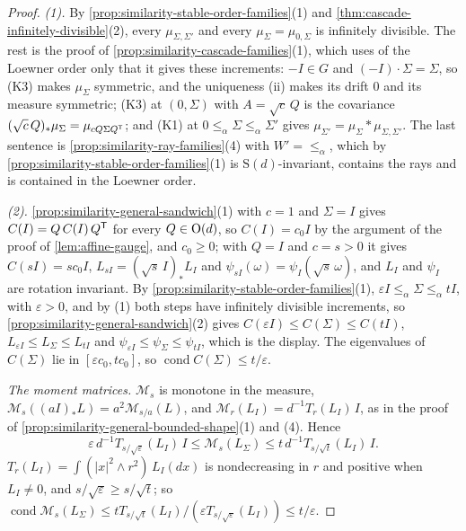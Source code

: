 \begin{proof}
\leanok
\emph{(1).} By \ref{prop:similarity-stable-order-families}(1) and \ref{thm:cascade-infinitely-divisible}(2), every $\mu_{\Sigma,\Sigma'}$ and every
$\mu_\Sigma = \mu_{0,\Sigma}$ is infinitely divisible. The rest is the proof of
\ref{prop:similarity-cascade-families}(1), which uses of the Loewner order only that it gives these
increments: $-I \in G$ and $(-I)\cdot\Sigma = \Sigma$, so (K3) makes $\mu_\Sigma$ symmetric, and the uniqueness
(ii) makes its drift $0$ and its \Levy{} measure symmetric; (K3) at $(0, \Sigma)$ with
$A = \sqrt c\,Q$ is the covariance $(\sqrt c\,Q)_*\mu_\Sigma = \mu_{cQ\Sigma Q^{\mathsf{T}}}$; and (K1) at
$0 \le_\alpha \Sigma \le_\alpha \Sigma'$ gives $\mu_{\Sigma'} = \mu_\Sigma * \mu_{\Sigma,\Sigma'}$. The last sentence
is \ref{prop:similarity-ray-families}(4) with $W' = \le_\alpha$, which by \ref{prop:similarity-stable-order-families}(1) is $\mathrm S(d)$-invariant,
contains the rays and is contained in the Loewner order.

\emph{(2).} \ref{prop:similarity-general-sandwich}(1) with $c = 1$ and $\Sigma = I$ gives $C(I) =
Q\,C(I)\,Q^{\mathsf{T}}$ for every $Q \in \mathrm{O}(d)$, so $C(I) = c_0I$ by the argument of the proof of
\ref{lem:affine-gauge}, and $c_0 \ge 0$; with $Q = I$ and $c = s > 0$ it gives $C(sI) = sc_0I$,
$L_{sI} = (\sqrt s\,I)_*L_I$ and $\psi_{sI}(\omega) = \psi_I(\sqrt s\,\omega)$, and $L_I$ and $\psi_I$ are
rotation invariant. By \ref{prop:similarity-stable-order-families}(1), $\varepsilon I \le_\alpha \Sigma \le_\alpha tI$, with $\varepsilon > 0$, and by (1) both steps have infinitely divisible increments, so \ref{prop:similarity-general-sandwich}(2) gives
$C(\varepsilon I) \le C(\Sigma) \le C(tI)$, $L_{\varepsilon I} \le L_\Sigma \le L_{tI}$ and
$\psi_{\varepsilon I} \le \psi_\Sigma \le \psi_{tI}$, which is the display. The eigenvalues of $C(\Sigma)$ lie
in $[\varepsilon c_0, tc_0]$, so $\operatorname{cond}C(\Sigma) \le t/\varepsilon$.

\emph{The moment matrices.} $\mathcal M_s$ is monotone in the \Levy{} measure, $\mathcal M_s((aI)_*L) =
a^2\mathcal M_{s/a}(L)$, and $\mathcal M_r(L_I) = d^{-1}T_r(L_I)\,I$, as in the proof of
\ref{prop:similarity-general-bounded-shape}(1) and (4). Hence
\[
  \varepsilon\,d^{-1}T_{s/\sqrt\varepsilon}(L_I)\,I \le \mathcal M_s(L_\Sigma) \le t\,d^{-1}T_{s/\sqrt t}(L_I)\,I .
\]
$T_r(L_I) = \int(|x|^2 \wedge r^2)\,L_I(dx)$ is nondecreasing in $r$ and positive when $L_I \ne 0$, and
$s/\sqrt\varepsilon \ge s/\sqrt t$; so $\operatorname{cond}\mathcal M_s(L_\Sigma) \le tT_{s/\sqrt t}(L_I)/
(\varepsilon T_{s/\sqrt\varepsilon}(L_I)) \le t/\varepsilon$.


\end{proof}
